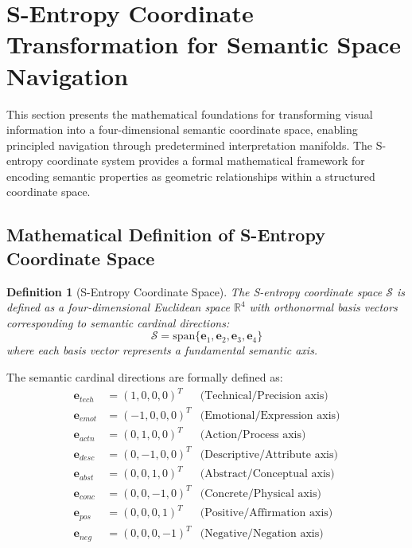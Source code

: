 \documentclass[11pt,a4paper]{article}
\newtheorem{definition}[theorem]{Definition}
\begin{document}
\section{S-Entropy Coordinate Transformation for Semantic Space Navigation}
\label{sec:s-entropy-coordinates}

This section presents the mathematical foundations for transforming visual information into a four-dimensional semantic coordinate space, enabling principled navigation through predetermined interpretation manifolds. The S-entropy coordinate system provides a formal mathematical framework for encoding semantic properties as geometric relationships within a structured coordinate space.

\subsection{Mathematical Definition of S-Entropy Coordinate Space}

\begin{definition}[S-Entropy Coordinate Space]
The S-entropy coordinate space $\mathcal{S}$ is defined as a four-dimensional Euclidean space $\mathbb{R}^4$ with orthonormal basis vectors corresponding to semantic cardinal directions:
\begin{equation}
\mathcal{S} = \text{span}\{\mathbf{e}_1, \mathbf{e}_2, \mathbf{e}_3, \mathbf{e}_4\}
\label{eq:s-entropy-space}
\end{equation}
where each basis vector represents a fundamental semantic axis.
\end{definition}

The semantic cardinal directions are formally defined as:
\begin{align}
\mathbf{e}_{tech} &= (1, 0, 0, 0)^T & \text{(Technical/Precision axis)} \label{eq:tech-axis} \\
\mathbf{e}_{emot} &= (-1, 0, 0, 0)^T & \text{(Emotional/Expression axis)} \label{eq:emot-axis} \\
\mathbf{e}_{actn} &= (0, 1, 0, 0)^T & \text{(Action/Process axis)} \label{eq:actn-axis} \\
\mathbf{e}_{desc} &= (0, -1, 0, 0)^T & \text{(Descriptive/Attribute axis)} \label{eq:desc-axis} \\
\mathbf{e}_{abst} &= (0, 0, 1, 0)^T & \text{(Abstract/Conceptual axis)} \label{eq:abst-axis} \\
\mathbf{e}_{conc} &= (0, 0, -1, 0)^T & \text{(Concrete/Physical axis)} \label{eq:conc-axis} \\
\mathbf{e}_{pos} &= (0, 0, 0, 1)^T & \text{(Positive/Affirmation axis)} \label{eq:pos-axis} \\
\mathbf{e}_{neg} &= (0, 0, 0, -1)^T & \text{(Negative/Negation axis)} \label{eq:neg-axis}
\end{align}
\end{document}
